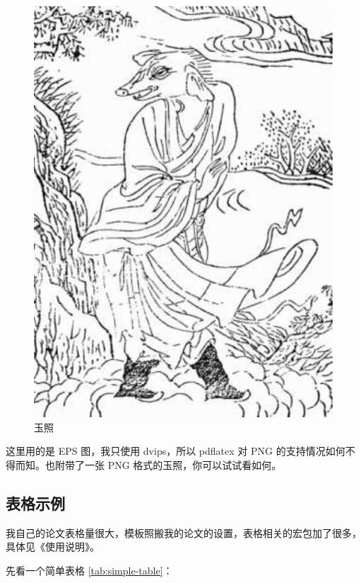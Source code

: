 \begin{figure}[htbp]
  \centering
  \includegraphics[scale=0.8]{images/zhubajie.pdf}
  \caption{玉照}
  \label{fig:example}
\end{figure}

这里用的是 EPS 图，我只使用 dvips，所以 pdflatex 对 PNG 的支持情况如何不得而知。\zjuthesis 也附带了一张 PNG 格式的玉照，你可以试试看如何。

\subsection{表格示例}

我自己的论文表格量很大，模板照搬我的论文的设置，表格相关的宏包加了很多，具体见《\zjuthesis 使用说明》。

先看一个简单表格 \ref{tab:simple-table}：

